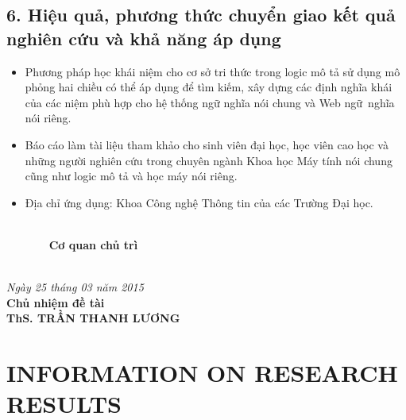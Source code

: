 \section*{6. Hiệu quả, phương thức chuyển giao kết quả nghiên cứu và khả năng áp dụng}
\begin{itemize}
	\item Phương pháp học khái niệm cho cơ sở tri thức trong logic mô tả sử dụng mô phỏng hai chiều có thể áp dụng để tìm kiếm, xây dựng các định nghĩa khái của các niệm phù hợp cho hệ thống ngữ nghĩa nói chung và Web ngữ~nghĩa nói riêng.

	\item Báo cáo làm tài liệu tham khảo cho sinh viên đại học, học viên cao học và những người nghiên cứu trong chuyên ngành Khoa học Máy tính nói chung cũng như logic mô tả và học máy nói riêng.

	\item Địa chỉ ứng dụng: Khoa Công nghệ Thông tin của các Trường Đại học.
\end{itemize}
\begin{minipage}{0.48\textwidth}
	\begin{flushleft}
		{\mbox{~}~}\\[0.4cm]
		{\bf\mbox{~~~~~~} Cơ quan chủ trì} \\[2.2cm]
		{~\;}
	\end{flushleft}
\end{minipage}
\begin{minipage}{0.55\textwidth}
	\begin{center}
		\textit{Ngày 25 tháng 03 năm 2015}\\
		{\bf Chủ nhiệm đề tài} \\[2.2cm]
		{\bf ThS. TRẦN THANH LƯƠNG}
	\end{center}
\end{minipage}		

\cleardoublepage
\newpage
\chapter*{INFORMATION ON RESEARCH RESULTS}
\thispagestyle{fancy}


